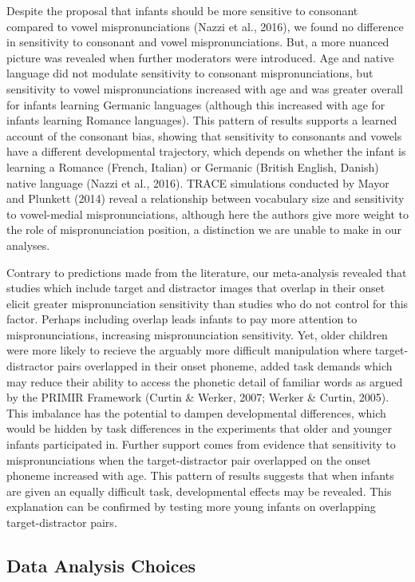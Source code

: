 \documentclass[man, noextraspace]{apa6}
\begin{document}
Despite the proposal that infants should be more sensitive to consonant compared to vowel mispronunciations (Nazzi et al., 2016), we found no difference in sensitivity to consonant and vowel mispronunciations. But, a more nuanced picture was revealed when further moderators were introduced. Age and native language did not modulate sensitivity to consonant mispronunciations, but sensitivity to vowel mispronunciations increased with age and was greater overall for infants learning Germanic languages (although this increased with age for infants learning Romance languages). This pattern of results supports a learned account of the consonant bias, showing that sensitivity to consonants and vowels have a different developmental trajectory, which depends on whether the infant is learning a Romance (French, Italian) or Germanic (British English, Danish) native language (Nazzi et al., 2016). TRACE simulations conducted by Mayor and Plunkett (2014) reveal a relationship between vocabulary size and sensitivity to vowel-medial mispronunciations, although here the authors give more weight to the role of mispronunciation position, a distinction we are unable to make in our analyses.

Contrary to predictions made from the literature, our meta-analysis revealed that studies which include target and distractor images that overlap in their onset elicit greater mispronunciation sensitivity than studies who do not control for this factor. Perhaps including overlap leads infants to pay more attention to mispronunciations, increasing mispronunciation sensitivity. Yet, older children were more likely to recieve the arguably more difficult manipulation where target-distractor pairs overlapped in their onset phoneme, added task demands which may reduce their ability to access the phonetic detail of familiar words as argued by the PRIMIR Framework (Curtin \& Werker, 2007; Werker \& Curtin, 2005). This imbalance has the potential to dampen developmental differences, which would be hidden by task differences in the experiments that older and younger infants participated in. Further support comes from evidence that sensitivity to mispronunciations when the target-distractor pair overlapped on the onset phoneme increased with age. This pattern of results suggests that when infants are given an equally difficult task, developmental effects may be revealed. This explanation can be confirmed by testing more young infants on overlapping target-distractor pairs.

\hypertarget{data-analysis-choices}{%
\subsection{Data Analysis Choices}\label{data-analysis-choices}}
\end{document}
